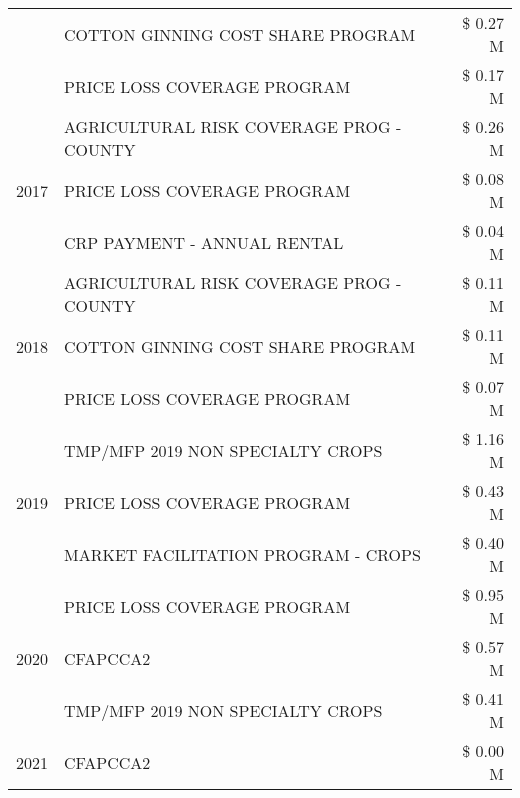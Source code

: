 \begin{tabular}{llr}
 & COTTON GINNING COST SHARE PROGRAM & \$ 0.27 M \\
 & PRICE LOSS COVERAGE PROGRAM & \$ 0.17 M \\
\cline{1-3}
\multirow[t]{3}{*}{2017} & AGRICULTURAL RISK COVERAGE PROG - COUNTY & \$ 0.26 M \\
 & PRICE LOSS COVERAGE PROGRAM & \$ 0.08 M \\
 & CRP PAYMENT - ANNUAL RENTAL & \$ 0.04 M \\
\cline{1-3}
\multirow[t]{3}{*}{2018} & AGRICULTURAL RISK COVERAGE PROG - COUNTY & \$ 0.11 M \\
 & COTTON GINNING COST SHARE PROGRAM & \$ 0.11 M \\
 & PRICE LOSS COVERAGE PROGRAM & \$ 0.07 M \\
\cline{1-3}
\multirow[t]{3}{*}{2019} & TMP/MFP 2019 NON SPECIALTY CROPS & \$ 1.16 M \\
 & PRICE LOSS COVERAGE PROGRAM & \$ 0.43 M \\
 & MARKET FACILITATION PROGRAM - CROPS & \$ 0.40 M \\
\cline{1-3}
\multirow[t]{3}{*}{2020} & PRICE LOSS COVERAGE PROGRAM & \$ 0.95 M \\
 & CFAPCCA2 & \$ 0.57 M \\
 & TMP/MFP 2019 NON SPECIALTY CROPS & \$ 0.41 M \\
\cline{1-3}
2021 & CFAPCCA2 & \$ 0.00 M \\
\cline{1-3}
\bottomrule
\end{tabular}

